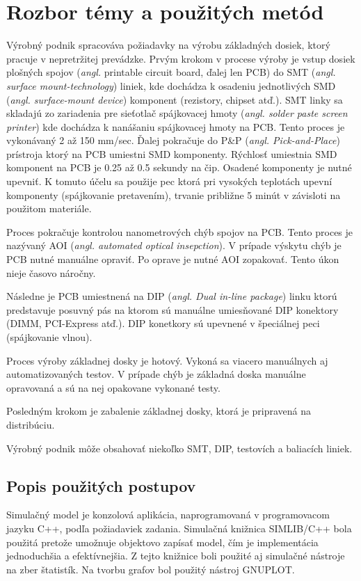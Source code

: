 \documentclass[12pt,a4paper,titlepage,final]{article}
\begin{document}
\section{Rozbor témy a použitých metód}
Výrobný podnik spracováva požiadavky na výrobu základných dosiek, ktorý pracuje
v nepretržitej prevádzke. Prvým krokom v procese výroby je vstup dosiek plošných
spojov (\textit{angl.} printable circuit board, ďalej len PCB) do SMT\cite{SMT}
(\textit{angl. surface mount-technology}) liniek, kde dochádza k osadeniu jednotlivých
SMD (\textit{angl. surface-mount device})\cite{SMT} komponent (rezistory, chipset atď.).
SMT linky sa skladajú zo zariadenia pre sieťotlač spájkovacej 
hmoty (\textit{angl. solder paste screen printer})\cite{screen-printer-DEK} kde
dochádza k nanášaniu spájkovacej hmoty na PCB. Tento proces je vykonávaný
2 až 150 mm/sec. Ďalej pokračuje do P\&P (\textit{angl. Pick-and-Place})\cite{smt-PNP}
prístroja ktorý na PCB umiestni SMD komponenty. Rýchlosť umiestnia SMD komponent
na PCB je 0.25 až 0.5 sekundy na čip. Osadené komponenty je nutné upevniť.
K tomuto účelu sa použije pec\cite{reflow-oven} ktorá pri vysokých teplotách upevní komponenty
(spájkovanie pretavením), trvanie približne 5 minút v závisloti na použitom materiále. 

Proces pokračuje kontrolou nanometrových chýb spojov na PCB. Tento proces je 
nazývaný AOI (\textit{angl. automated optical insepction})\cite{AOI}. V prípade výskytu
chýb je PCB nutné manuálne opraviť. Po oprave je nutné AOI zopakovať. Tento
úkon nieje časovo náročny.

Následne je PCB umiestnená na DIP (\textit{angl. Dual in-line package})
linku ktorú predstavuje posuvný pás na ktorom sú manuálne umiesňované 
DIP konektory (DIMM, PCI-Express atď.). DIP konetkory sú upevnené v špeciálnej
peci (spájkovanie vlnou).

Proces výroby základnej dosky je hotový. Vykoná sa viacero manuálnych aj automatizovaných
testov. V prípade chýb je základná doska manuálne opravovaná a sú na nej opakovane vykonané
testy.

Posledným krokom je zabalenie základnej dosky, ktorá je pripravená na distribúciu.

Výrobný podnik môže obsahovať niekoľko SMT, DIP, testovích a baliacích liniek.

\subsection{Popis použitých postupov}
Simulačný model je konzolová aplikácia, naprogramovaná v programovacom jazyku
C++, podľa požiadaviek zadania. Simulačná knižnica SIMLIB/C++\cite{SIMLIB} bola použitá pretože
umožnuje objektovo zapísať model, čím je implementácia jednoduchšia a efektívnejšia.
Z tejto knižnice boli použité aj simulačné nástroje na zber štatistík. Na tvorbu
grafov bol použitý nástroj GNUPLOT\cite{gnuplot}.
\end{document}
